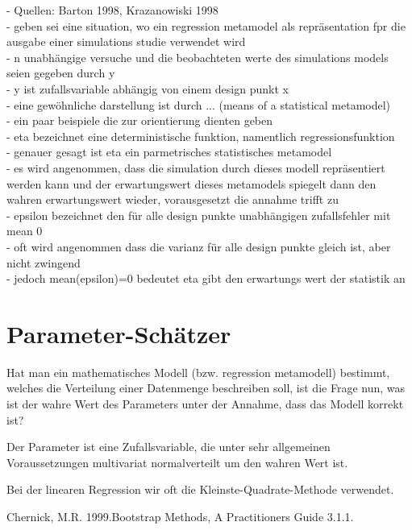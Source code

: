 - Quellen: Barton 1998, Krazanowiski 1998\\
- geben sei eine situation, wo ein regression metamodel als repräsentation fpr die ausgabe einer simulations studie verwendet wird\\
- n unabhängige versuche und die beobachteten werte des simulations models seien gegeben durch y\\
- y ist zufallsvariable abhängig von einem design punkt x\\
- eine gewöhnliche darstellung ist durch ... (means of a statistical metamodel)\\
- ein paar beispiele die zur orientierung dienten geben\\
- eta bezeichnet eine deterministische funktion, namentlich regressionsfunktion\\
- genauer gesagt ist eta ein parmetrisches statistisches metamodel\\
- es wird angenommen, dass die simulation durch dieses modell repräsentiert werden kann und der erwartungswert dieses metamodels spiegelt dann den wahren erwartungswert wieder, vorausgesetzt die annahme trifft zu\\
- epsilon bezeichnet den für alle design punkte unabhängigen zufallsfehler mit mean 0\\
- oft wird angenommen dass die varianz für alle design punkte gleich ist, aber nicht zwingend\\
- jedoch mean(epsilon)=0 bedeutet eta gibt den erwartungs wert der statistik an\\


\section{Parameter-Schätzer}
Hat man ein mathematisches Modell (bzw. regression metamodell) bestimmt, welches die Verteilung einer Datenmenge beschreiben soll, ist die Frage nun, was ist der wahre Wert des Parameters unter der Annahme, dass das Modell korrekt ist?

Der Parameter ist eine Zufallsvariable, die unter sehr allgemeinen Voraussetzungen multivariat normalverteilt um den wahren Wert ist.



Bei der linearen Regression wir oft die Kleinste-Quadrate-Methode verwendet. 

Chernick, M.R. 1999.Bootstrap Methods, A Practitioners Guide 3.1.1.

